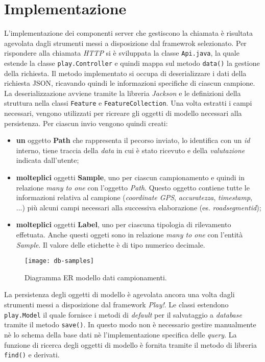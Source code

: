 \section{Implementazione}
L'implementazione dei componenti server che gestiscono la chiamata è risultata agevolata dagli strumenti messi a disposizione dal framewrok selezionato. Per rispondere alla chiamata \emph{HTTP} si è sviluppata la classe \texttt{Api.java}, la quale estende la classe \texttt{play.Controller} e quindi mappa sul metodo \texttt{data()} la gestione della richiesta.
Il metodo implementato si occupa di deserializzare i dati della richiesta JSON, ricavando quindi le informazioni specifiche di ciascun campione. La deserializzazione avviene tramite la libreria \emph{Jackson} e le definizioni della struttura nella classi \texttt{Feature} e \texttt{FeatureCollection}.
Una volta estratti i campi necessari, vengono utilizzati per ricreare gli oggetti di modello necessari alla persistenza. Per ciascun invio vengono quindi creati:
\begin{itemize}
    \item \textbf{un} oggetto \textbf{Path} che rappresenta il pecorso inviato, lo identifica con un \emph{id} interno, tiene traccia della \emph{data} in cui è stato ricevuto e della \emph{valutazione} indicata dall'utente;
    \item \textbf{molteplici} oggetti \textbf{Sample}, uno per ciascun campionamento e quindi in relazione \emph{many to one} con l'oggetto \emph{Path}. Questo oggetto contiene tutte le informazioni relativa al campione (\emph{coordinate GPS}, \emph{accuratezza}, \emph{timestamp}, ...) più alcuni campi necessari alla successiva elaborazione (es. \emph{roadsegment\textunderscore id});
    \item \textbf{molteplici} oggetti \textbf{Label}, uno per ciascuna tipologia di rilevamento effetuata. Anche questi oggeti sono in relazione \emph{many to one} con l'entità \emph{Sample}. Il valore delle etichette è di tipo numerico decimale.
\end{itemize}

\begin{figure}[ht]
  \centering
  \texttt{[image: db-samples]}
  \caption{\footnotesize{Diagramma ER modello dati campionamenti.}}
  \label{fig:db-samples}
\end{figure}
La persistenza degli oggetti di modello è agevolata ancora una volta dagli strumenti messi a disposizione dal framework \emph{Play!}. Le classi estendono \texttt{play.Model} il quale fornisce i metodi di \emph{default} per il salvataggio a \emph{database} tramite il metodo \texttt{save()}. In questo modo non è necessario gestire manualmente nè lo schema della base dati nè l'implementazione specifica delle \emph{query}. La funzione di ricerca degli oggetti di modello è fornita tramite il metodo di libreria \texttt{find()} e derivati.


